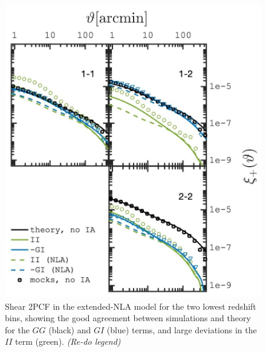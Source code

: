 \begin{figure}
\includegraphics[width=\columnwidth]{graphs/xip_deltaNLA_bta1}
\caption{Shear 2PCF in the extended-NLA model for the two lowest redshift bins, showing the good agreement between simulations and theory for the $GG$ (black) and $GI$ (blue) terms, and large deviations in the $II$ term (green). {\it (Re-do legend)}}
\label{fig:xi_deltaNLA_II}
\end{figure}